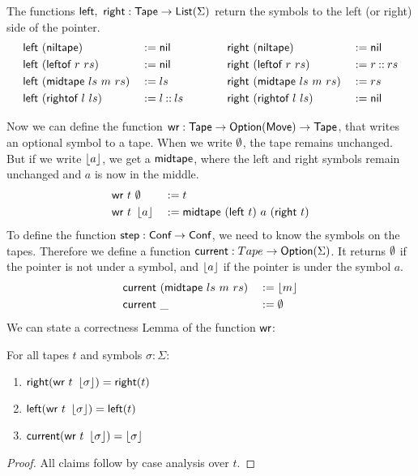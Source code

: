 The functions $\textsf{left},~\textsf{right} : \textsf{Tape} \rightarrow \textsf{List}(\Sigma)$ return the symbols to the left (or right) side of the pointer.
\begin{alignat*}{4}
  \textsf{left} &~(\textsf{niltape})                 &&:= \textsf{nil}
  \quad\quad\quad\quad
  & \textsf{right}&~(\textsf{niltape})               &&:= \textsf{nil} \\
  \textsf{left} &~(\textsf{leftof}~{r}~{rs})         &&:= \textsf{nil}
  & \textsf{right}&~(\textsf{leftof}~{r}~{rs})       &&:= r \mathbin{::} rs \\
  \textsf{left} &~(\textsf{midtape}~{ls}~{m}~{rs})   &&:= ls
  & \textsf{right}&~(\textsf{midtape}~{ls}~{m}~{rs}) &&:= rs \\
  \textsf{left} &~(\textsf{rightof}~{l}~{ls})        &&:= l \mathbin{::} ls
  & \textsf{right}&~(\textsf{rightof}~{l}~{ls})      &&:= \textsf{nil}
\end{alignat*}


Now we can define the function $\textsf{wr} : \textsf{Tape} \rightarrow \textsf{Option}(\textsf{Move}) \rightarrow \textsf{Tape}$, that writes an optional symbol to a tape.  When we write $\emptyset$,
the tape remains unchanged.  But if we write $\left\lfloor {a}\right\rfloor$, we get a $\textsf{midtape}$, where the left and right symbols remain unchanged and $a$ is now in
the middle.
\begin{alignat*}{3}
  \textsf{wr}~t &~ \emptyset   &&:= t \\
  \textsf{wr}~t &~ \left\lfloor {a}\right\rfloor &&:= \textsf{midtape}~(\textsf{left}~t)~{a}~(\textsf{right}~t)
\end{alignat*}
To define the function $\textsf{step} : \textsf{Conf} \rightarrow \textsf{Conf}$, we need to know the symbols on the tapes.
Therefore we define a function $\textsf{current} : Tape \rightarrow \textsf{Option}(\Sigma)$.
It returns $\emptyset$ if the pointer is not under a symbol, and $\left\lfloor {a}\right\rfloor$ if the pointer is under the symbol $a$.
\begin{alignat*}{2}
  \textsf{current}&~(\textsf{midtape}~{ls}~{m}~{rs})&&:= \left\lfloor {m}\right\rfloor \\
  \textsf{current}&~\_                          &&:= \emptyset
\end{alignat*}
We can state a correctness Lemma of the function $\MS{wr}$:
\begin{lemma}[Correctness of $\MS{wr}$]
  \label{lem:write}
  For all tapes $t$ and symbols $\sigma:\Sigma$:
  \begin{enumerate}
  \item $\textsf{right}   (\textsf{wr}~t~\left\lfloor {\sigma}\right\rfloor) = \textsf{right}(t)$
  \item $\textsf{left}    (\textsf{wr}~t~\left\lfloor {\sigma}\right\rfloor) = \textsf{left} (t)$
  \item $\textsf{current} (\textsf{wr}~t~\left\lfloor {\sigma}\right\rfloor) = \left\lfloor {\sigma}\right\rfloor$
  \end{enumerate}
\end{lemma}
\begin{proof}
  All claims follow by case analysis over $t$.
\end{proof}


